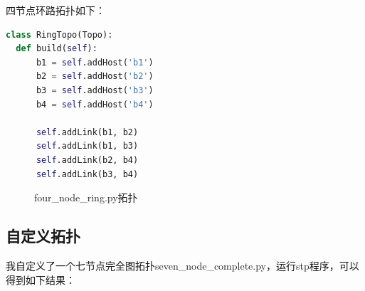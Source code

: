 \documentclass[UTF8]{report}
\begin{document}
四节点环路拓扑如下：

\begin{lstlisting}[language=Python]
  class RingTopo(Topo):
  def build(self):
      b1 = self.addHost('b1')
      b2 = self.addHost('b2')
      b3 = self.addHost('b3')
      b4 = self.addHost('b4')

      self.addLink(b1, b2)
      self.addLink(b1, b3)
      self.addLink(b2, b4)
      self.addLink(b3, b4)
\end{lstlisting}

\begin{figure}[H]
  \centering
  \caption{four\_node\_ring.py拓扑}
\end{figure}

\subsection{自定义拓扑}

我自定义了一个七节点完全图拓扑seven_node_complete.py，运行stp程序，可以得到如下结果：
\end{document}
